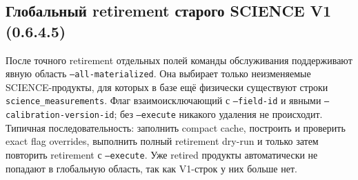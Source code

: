 \subsection{Глобальный retirement старого SCIENCE V1 (0.6.4.5)}
После точного retirement отдельных полей команды обслуживания поддерживают явную область
\texttt{--all-materialized}. Она выбирает только неизменяемые SCIENCE-продукты, для которых
в базе ещё физически существуют строки \texttt{science\_measurements}. Флаг взаимоисключающий
с \texttt{--field-id} и явными \texttt{--calibration-version-id}; без \texttt{--execute}
никакого удаления не происходит. Типичная последовательность: заполнить compact cache,
построить и проверить exact flag overrides, выполнить полный retirement dry-run и только затем
повторить retirement с \texttt{--execute}. Уже retired продукты автоматически не попадают в
глобальную область, так как V1-строк у них больше нет.
